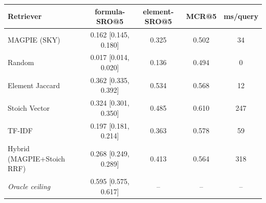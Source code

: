 \begin{tabular}{lcccc}
\toprule
Retriever & formula-SRO@5 & element-SRO@5 & MCR@5 & ms/query \\
\midrule
MAGPIE (SKY) & 0.162 [0.145, 0.180] & 0.325 & 0.502 & 34 \\
Random & 0.017 [0.014, 0.020] & 0.136 & 0.494 & 0 \\
Element Jaccard & 0.362 [0.335, 0.392] & 0.534 & 0.568 & 12 \\
Stoich Vector & 0.324 [0.301, 0.350] & 0.485 & 0.610 & 247 \\
TF-IDF & 0.197 [0.181, 0.214] & 0.363 & 0.578 & 59 \\
Hybrid (MAGPIE+Stoich RRF) & 0.268 [0.249, 0.289] & 0.413 & 0.564 & 318 \\
\midrule
\emph{Oracle ceiling} & 0.595 [0.575, 0.617] & -- & -- & -- \\
\bottomrule
\end{tabular}
